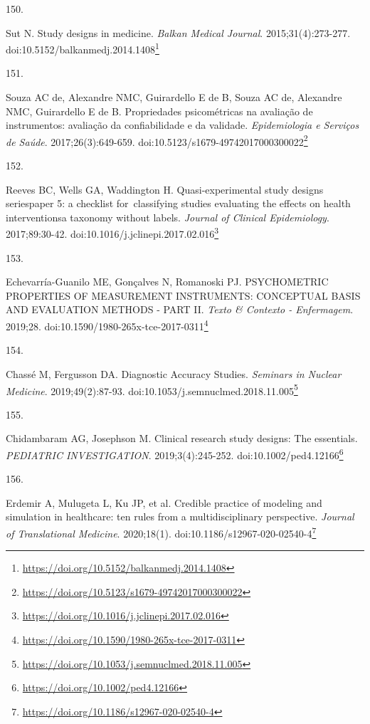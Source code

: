 \documentclass[
  a4paper,
]{book}
\newlength{\cslhangindent}
\newlength{\csllabelwidth}
\newlength{\cslentryspacingunit} %
\newenvironment{CSLReferences}[2] %
 {%
  \setlength{\parindent}{0pt}
  \ifodd #1
  \let\oldpar\par
  \def\par{\hangindent=\cslhangindent\oldpar}
  \fi
  \setlength{\parskip}{#2\cslentryspacingunit}
 }%
 {}
\newcommand{\CSLLeftMargin}[1]{\parbox[t]{\csllabelwidth}{#1}}
\newcommand{\CSLRightInline}[1]{\parbox[t]{\linewidth - \csllabelwidth}{#1}\break}
\renewcommand{\href}[2]{#2\footnote{\url{#1}}}
\begin{document}
\begin{CSLReferences}{0}{0}
\leavevmode{}%
\CSLLeftMargin{150. }%
\CSLRightInline{Sut N. Study designs in medicine. \emph{Balkan Medical Journal}. 2015;31(4):273-277. doi:\href{https://doi.org/10.5152/balkanmedj.2014.1408}{10.5152/balkanmedj.2014.1408}}

\leavevmode{}%
\CSLLeftMargin{151. }%
\CSLRightInline{Souza AC de, Alexandre NMC, Guirardello E de B, Souza AC de, Alexandre NMC, Guirardello E de B. Propriedades psicométricas na avaliação de instrumentos: avaliação da confiabilidade e da validade. \emph{Epidemiologia e Serviços de Saúde}. 2017;26(3):649-659. doi:\href{https://doi.org/10.5123/s1679-49742017000300022}{10.5123/s1679-49742017000300022}}

\leavevmode{}%
\CSLLeftMargin{152. }%
\CSLRightInline{Reeves BC, Wells GA, Waddington H. Quasi-experimental study designs series{\textemdash}paper 5: a checklist for~classifying studies evaluating the effects on health interventions{\textemdash}a taxonomy without labels. \emph{Journal of Clinical Epidemiology}. 2017;89:30-42. doi:\href{https://doi.org/10.1016/j.jclinepi.2017.02.016}{10.1016/j.jclinepi.2017.02.016}}

\leavevmode{}%
\CSLLeftMargin{153. }%
\CSLRightInline{Echevarría-Guanilo ME, Gonçalves N, Romanoski PJ. PSYCHOMETRIC PROPERTIES OF MEASUREMENT INSTRUMENTS: CONCEPTUAL BASIS AND EVALUATION METHODS - PART II. \emph{Texto \& Contexto - Enfermagem}. 2019;28. doi:\href{https://doi.org/10.1590/1980-265x-tce-2017-0311}{10.1590/1980-265x-tce-2017-0311}}

\leavevmode{}%
\CSLLeftMargin{154. }%
\CSLRightInline{Chassé M, Fergusson DA. Diagnostic Accuracy Studies. \emph{Seminars in Nuclear Medicine}. 2019;49(2):87-93. doi:\href{https://doi.org/10.1053/j.semnuclmed.2018.11.005}{10.1053/j.semnuclmed.2018.11.005}}

\leavevmode{}%
\CSLLeftMargin{155. }%
\CSLRightInline{Chidambaram AG, Josephson M. Clinical research study designs: The essentials. \emph{PEDIATRIC INVESTIGATION}. 2019;3(4):245-252. doi:\href{https://doi.org/10.1002/ped4.12166}{10.1002/ped4.12166}}

\leavevmode{}%
\CSLLeftMargin{156. }%
\CSLRightInline{Erdemir A, Mulugeta L, Ku JP, et al. Credible practice of modeling and simulation in healthcare: ten rules from a multidisciplinary perspective. \emph{Journal of Translational Medicine}. 2020;18(1). doi:\href{https://doi.org/10.1186/s12967-020-02540-4}{10.1186/s12967-020-02540-4}}


\end{CSLReferences}
\end{document}
